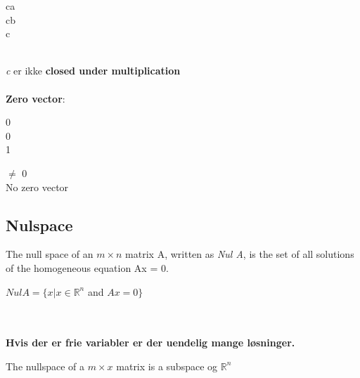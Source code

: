 \documentclass[danish, english]{article}
\begin{document}
\begin{ArgMat}
ca\\
cb\\
c
\end{ArgMat}\\
\textit{c} er ikke \textbf{closed under multiplication}
\\
\\
\textbf{Zero vector}:
\\
\begin{ArgMat}
0\\
0\\
1
\end{ArgMat} $\neq$ 0
\\
No zero vector





\newpage
\subsection*{Nulspace}
\begin{theo}[Definition] 
The null space of an $m \times n$ matrix A, written as \textit{Nul A}, is the set of all solutions
of the homogeneous equation Ax = 0. 
\\
\centerline{$Nul A= \{x | x \in \mathbb{R}^n $ and $Ax = 0\}$}
\\
\\
\textbf{Hvis der er frie variabler er der uendelig mange løsninger.}
\end{theo}


\begin{theo}[Theorem 2] 
The nullspace of a $m \times x$ matrix is a subspace og $\mathbb{R}^n$
\end{theo}
\end{document}
